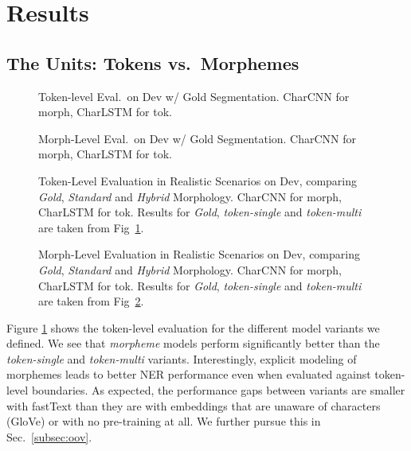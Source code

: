 \documentclass[11pt,a4paper]{article}
\newcommand{\TOKMACRO}{{\em token-single}\xspace}
\newcommand{\MULMACRO}{{\em token-multi}\xspace}
\newcommand{\MORMACRO}{{\em morpheme}\xspace}
\newcommand{\FLIPMACRO}{{\em Hybrid}\xspace}
\newcommand{\YAPMACRO}{{\em Standard}\xspace}
\begin{document}
\section{Results}


\subsection{The Units: Tokens vs.\ Morphemes}
\label{sec:units}


\begin{figure}[t]
  \caption{\label{fig:tok-morph-tokeval} 
  Token-level Eval.\ on Dev w/ Gold Segmentation. CharCNN for morph, CharLSTM for tok.}
\end{figure}
\begin{figure}[t]
  \caption{\label{fig:tok-morph-morpheval}
  Morph-Level Eval.\ on Dev w/ Gold Segmentation. CharCNN for morph, CharLSTM for tok.}
\end{figure}

\begin{figure}[t]
  \caption{\label{fig:realistic-tokeval} 
  Token-Level Evaluation in  Realistic Scenarios on Dev, comparing \emph{Gold}, \YAPMACRO and \FLIPMACRO   Morphology. CharCNN for morph, CharLSTM for tok. Results for {\em Gold}, \TOKMACRO and \MULMACRO are taken from Fig~\ref{fig:tok-morph-tokeval}. }
\end{figure}


\begin{figure}[t]
  \caption{\label{fig:realistic-morpheval} 
 Morph-Level Evaluation in  Realistic Scenarios
 on Dev, comparing \emph{Gold}, \YAPMACRO and \FLIPMACRO   Morphology. CharCNN for morph, CharLSTM for tok. Results for {\em Gold}, \TOKMACRO and \MULMACRO are taken from Fig~\ref{fig:tok-morph-morpheval}.}
\end{figure}

Figure \ref{fig:tok-morph-tokeval} shows the token-level evaluation for the different model variants we defined. We see that \MORMACRO models perform significantly better than the \TOKMACRO and \MULMACRO variants. Interestingly,  explicit modeling of morphemes leads to better NER performance even when evaluated against token-level boundaries. As expected, the performance gaps between variants are smaller with fastText  than they are with  embeddings that are unaware of characters (GloVe) or with no pre-training at all. We further pursue 
this in Sec.~\ref{subsec:oov}.   
\end{document}
